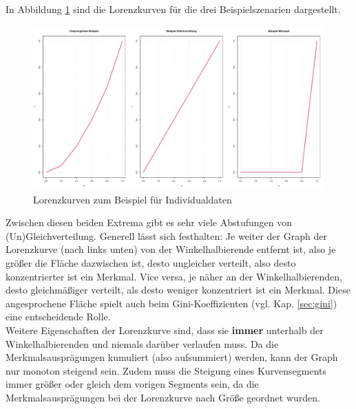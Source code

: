 \documentclass[a4paper]{article}
\begin{document}
\noindent In Abbildung \ref{fig:lk1} sind die Lorenzkurven für die drei Beispielszenarien dargestellt.
\begin{figure}[htbp]
    \centering
\includegraphics[width = .9\textwidth]{figures/example_lc.pdf}
    \caption{Lorenzkurven zum Beispiel für Individualdaten}
    \label{fig:lk1}
\end{figure}

\noindent Zwischen diesen beiden Extrema gibt es sehr viele Abstufungen von (Un)Gleichverteilung.
Generell lässt sich festhalten: Je weiter der Graph der Lorenzkurve (nach links unten) von der Winkelhalbierende entfernt ist, also je größer die Fläche dazwischen ist, desto ungleicher verteilt, also desto konzentrierter ist ein Merkmal. Vice versa, je näher an der Winkelhalbierenden, desto gleichmäßiger verteilt, als desto weniger konzentriert ist ein Merkmal. Diese angesprochene Fläche spielt auch beim Gini-Koeffizienten (vgl. Kap. \ref{sec:gini}) eine entscheidende Rolle.\\
Weitere Eigenschaften der Lorenzkurve sind, dass sie \textbf{immer} unterhalb der Winkelhalbierenden und niemals darüber verlaufen muss. Da die Merkmalsausprägungen kumuliert (also aufsummiert) werden, kann der Graph nur monoton steigend sein. Zudem muss die Steigung eines Kurvensegments immer größer oder gleich dem vorigen Segments sein, da die Merkmalsausprägungen bei der Lorenzkurve nach Größe geordnet wurden.
\end{document}
